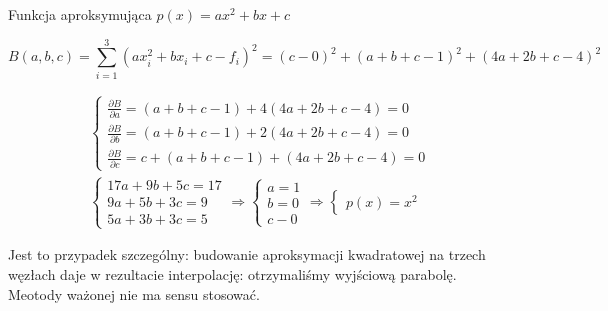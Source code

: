 \documentclass[10pt, a4paper]{article}
\begin{document}
Funkcja aproksymująca $p(x)=ax^2+bx+c$

\[B(a,b,c)=\sum_{i=1}^3(ax_i^2+bx_i+c-f_i)^2=(c-0)^2+(a+b+c-1)^2+(4a+2b+c-4)^2\]

\begin{gather*}
\begin{cases}
\frac{\partial B}{\partial a}=(a+b+c-1)+4(4a+2b+c-4)=0\\
\frac{\partial B}{\partial b}=(a+b+c-1)+2(4a+2b+c-4)=0\\
\frac{\partial B}{\partial c}=c+(a+b+c-1)+(4a+2b+c-4)=0
\end{cases}\\
\begin{cases}
17a+9b+5c=17\\
9a+5b+3c=9\\
5a+3b+3c=5
\end{cases}
\Rightarrow
\begin{cases}
a=1\\
b=0\\
c-0
\end{cases}
\Rightarrow
\begin{cases}
p(x)=x^2
\end{cases}
\end{gather*}

Jest to przypadek szczególny: budowanie aproksymacji kwadratowej na trzech węzłach daje w rezultacie interpolację: otrzymaliśmy wyjściową parabolę. Meotody ważonej nie ma sensu stosować.
\end{document}
